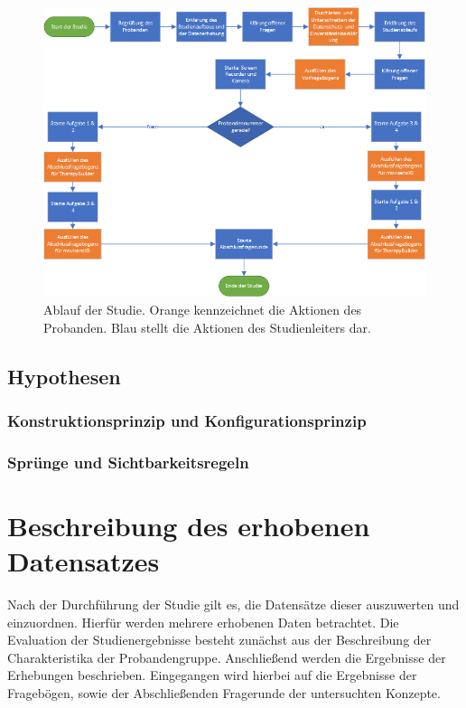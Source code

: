 \begin{figure}[h]
\centering
\includegraphics[width=1\textwidth]{pictures/diagramme/studienablauf-diagramm}
\caption{Ablauf der Studie. Orange kennzeichnet die Aktionen des Probanden. Blau stellt die Aktionen des Studienleiters dar.}
\label{studienablauf}
\end{figure}


\subsection{Hypothesen}
\subsubsection{Konstruktionsprinzip und Konfigurationsprinzip}
\subsubsection{Sprünge und Sichtbarkeitsregeln}

\section{Beschreibung des erhobenen Datensatzes}
Nach der Durchführung der Studie gilt es, die Datensätze dieser auszuwerten und einzuordnen. Hierfür werden mehrere erhobenen Daten betrachtet. Die Evaluation der Studienergebnisse besteht zunächst aus der Beschreibung der Charakteristika der Probandengruppe. Anschließend werden die Ergebnisse der Erhebungen beschrieben. Eingegangen wird hierbei auf die Ergebnisse der Fragebögen, sowie der Abschließenden Fragerunde der untersuchten Konzepte.  


